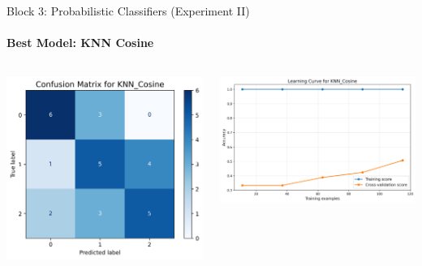 \documentclass[9pt]{beamer}
\begin{document}
    \begin{frame}{Block 3: Probabilistic Classifiers (Experiment II)}
    \framesubtitle{Best Model: KNN Cosine}
    \begin{columns}
        \begin{column}{0.33\textwidth}
            \centering
            \includegraphics[width=\textwidth]{code/ResultsMainAugZip/plots/Block3_Probabilistic_Experiment_II/confusion_matrix_KNN_Cosine.png}
        \end{column}
        \begin{column}{0.33\textwidth}
            \centering
            \includegraphics[width=\textwidth]{code/ResultsMainAugZip/plots/Block3_Probabilistic_Experiment_II/learning_curve_KNN_Cosine.png}

\end{column}
\end{columns}
\end{frame}
\end{document}
